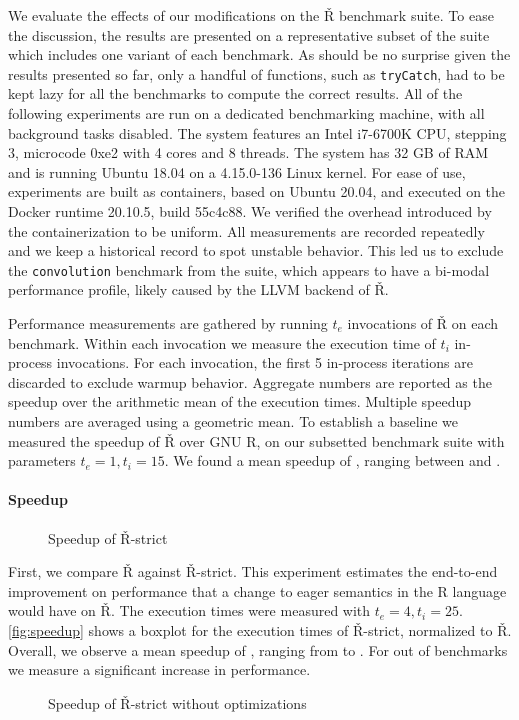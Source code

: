 \documentclass[review,nonacm,screen,acmsmall,anonymous=true]{acmart}
\renewcommand{\Rsh}{{\sf\v R}\xspace}
\newcommand{\Rshstrict}{{\sf\v R-strict}\xspace}
\begin{document}
We evaluate the effects of our modifications on the \Rsh benchmark suite.
To ease the discussion, the results are presented on a representative subset of
the suite which includes one variant of
each benchmark. As should be no surprise given the results presented so far,
only a handful of functions, such as
\lstinline{tryCatch}, had to be kept lazy for all the benchmarks to compute
the correct results.
All of the following experiments are run on a dedicated benchmarking machine, with
all background tasks disabled. The system features an Intel i7-6700K CPU, stepping 3,
microcode 0xe2 with 4 cores and 8 threads. The system has 32 GB of RAM and is
running Ubuntu 18.04 on a 4.15.0-136 Linux kernel. For ease of use, experiments
are built as containers, based on Ubuntu 20.04, and executed on
the Docker runtime 20.10.5, build 55c4c88. We verified the overhead introduced by
the containerization to be uniform. All measurements are recorded repeatedly and we
keep a historical record to spot unstable behavior. This led us to exclude the
\lstinline{convolution} benchmark from the suite, which appears to have a
bi-modal performance profile, likely caused by the LLVM backend of \Rsh.

Performance measurements are gathered by running $t_e$ invocations of \Rsh on
each benchmark. Within each invocation we measure the execution time of $t_i$
in-process invocations. For each invocation, the first 5 in-process iterations
are discarded to exclude warmup behavior. Aggregate numbers are reported as the
speedup over the arithmetic mean of the execution times. Multiple speedup
numbers are averaged using a geometric mean. To establish a baseline we measured
the speedup of \Rsh over GNU R, on our subsetted benchmark suite with parameters
$t_e = 1, t_i = 15$. We found a mean speedup of \speedupRsh, ranging between
\speedupRshMin and \speedupRshMax.

\paragraph{Speedup}

\begin{figure}[h]
  \centering
  
  \caption{Speedup of \Rshstrict}
  \label{fig:speedup}
\end{figure}

First, we compare \Rsh against \Rshstrict. This experiment estimates the end-to-end
improvement on performance that a change to eager semantics in the R language
would have on \Rsh. The execution times were measured with $t_e = 4, t_i = 25$.
\autoref{fig:speedup} shows a boxplot for the execution times of \Rsh-strict,
normalized to \Rsh. Overall, we observe a mean speedup of
\speedupRshStrict, ranging from \speedupRshStrictMin to \speedupRshStrictMax.
For \speedupRshStrictSignificant out of \benchmarkSuiteSize benchmarks we measure a significant increase in performance.
%
\begin{figure}[h]
  \centering
  
  \caption{Speedup of \Rshstrict without optimizations}
  \label{fig:speedup-bc}
\end{figure}
%
\end{document}
